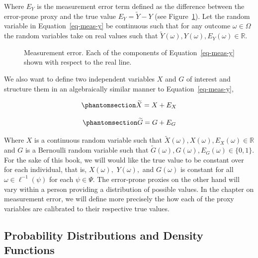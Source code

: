\documentclass[
  letterpaper,
  DIV=11,
  numbers=noendperiod]{scrreprt}
\begin{document}
Where \(E_Y\) is the measurement error term defined as the difference
between the error-prone proxy and the true value
\(E_Y = \widetilde{Y} - Y\) (see Figure~\ref{fig-me}). Let the random
variable in Equation~\ref{eq-meas-y} be continuous such that for any
outcome \(\omega\in\Omega\) the random variables take on real values
such that
\(\widetilde{Y}(\omega), Y(\omega), E_Y(\omega) \in \mathbb{R}\).

\begin{figure}[H]


\caption{\label{fig-me}Measurement error. Each of the components of
Equation~\ref{eq-meas-y} shown with respect to the real line.}

\end{figure}%

We also want to define two independent variables \(X\) and \(G\) of
interest and structure them in an algebraically similar manner to
Equation~\ref{eq-meas-y},

\begin{equation}\phantomsection\label{eq-meas-x}{
\widetilde{X} = X + E_X
}\end{equation}

\begin{equation}\phantomsection\label{eq-meas-g}{
\widetilde{G} = G + E_G
}\end{equation}

Where \(X\) is a continuous random variable such that
\(\widetilde{X}(\omega), X(\omega), E_X(\omega) \in \mathbb{R}\) and
\(G\) is a Bernoulli random variable such that
\(\widetilde{G}(\omega), G(\omega), E_G(\omega) \in\{0,1\}\). For the
sake of this book, we will would like the true value to be constant over
for each individual, that is, \(X(\omega),\) \(Y(\omega),\) and
\(G(\omega)\) is constant for all \(\omega \in \ell^{-1}(\psi)\) for
each \(\psi \in \Psi\). The error-prone proxies on the other hand will
vary within a person providing a distribution of possible values. In the
chapter on measurement error, we will define more precisely the how each
of the proxy variables are calibrated to their respective true values.

\subsection{Probability Distributions and Density
Functions}\label{probability-distributions-and-density-functions}
\end{document}
